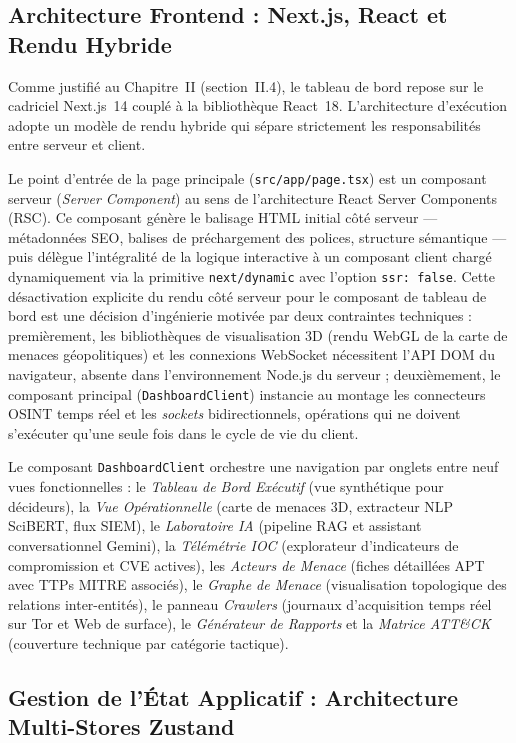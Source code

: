 \subsection{Architecture Frontend : Next.js, React et Rendu Hybride}

Comme justifié au Chapitre~II (section~II.4), le tableau de bord repose sur le cadriciel Next.js~14 couplé à la bibliothèque React~18. L'architecture d'exécution adopte un modèle de rendu hybride qui sépare strictement les responsabilités entre serveur et client.

Le point d'entrée de la page principale (\texttt{src/app/page.tsx}) est un composant serveur (\textit{Server Component}) au sens de l'architecture React Server Components (RSC). Ce composant génère le balisage HTML initial côté serveur --- métadonnées SEO, balises de préchargement des polices, structure sémantique --- puis délègue l'intégralité de la logique interactive à un composant client chargé dynamiquement via la primitive \texttt{next/dynamic} avec l'option \texttt{ssr:~false}. Cette désactivation explicite du rendu côté serveur pour le composant de tableau de bord est une décision d'ingénierie motivée par deux contraintes techniques : premièrement, les bibliothèques de visualisation 3D (rendu WebGL de la carte de menaces géopolitiques) et les connexions WebSocket nécessitent l'API DOM du navigateur, absente dans l'environnement Node.js du serveur ; deuxièmement, le composant principal (\texttt{DashboardClient}) instancie au montage les connecteurs OSINT temps réel et les \textit{sockets} bidirectionnels, opérations qui ne doivent s'exécuter qu'une seule fois dans le cycle de vie du client.

Le composant \texttt{DashboardClient} orchestre une navigation par onglets entre neuf vues fonctionnelles : le \textit{Tableau de Bord Exécutif} (vue synthétique pour décideurs), la \textit{Vue Opérationnelle} (carte de menaces 3D, extracteur NLP SciBERT, flux SIEM), le \textit{Laboratoire IA} (pipeline RAG et assistant conversationnel Gemini), la \textit{Télémétrie IOC} (explorateur d'indicateurs de compromission et CVE actives), les \textit{Acteurs de Menace} (fiches détaillées APT avec TTPs MITRE associés), le \textit{Graphe de Menace} (visualisation topologique des relations inter-entités), le panneau \textit{Crawlers} (journaux d'acquisition temps réel sur Tor et Web de surface), le \textit{Générateur de Rapports} et la \textit{Matrice ATT\&CK} (couverture technique par catégorie tactique).

\subsection{Gestion de l'État Applicatif : Architecture Multi-Stores Zustand}

